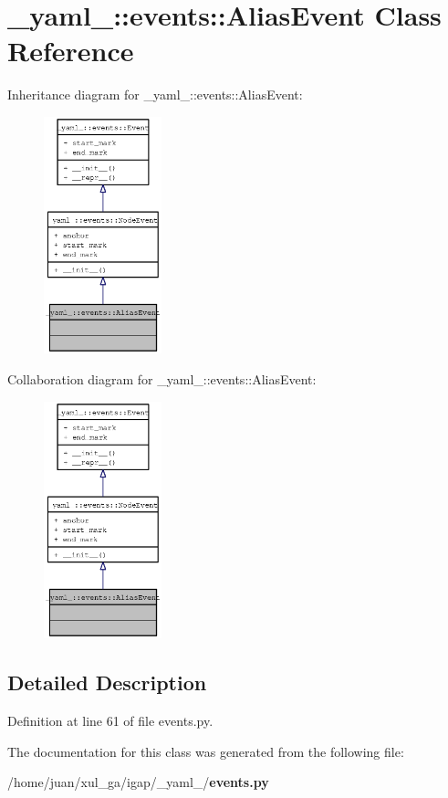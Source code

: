 \section{\_\-yaml\_\-::events::AliasEvent Class Reference}
\label{class__yaml___1_1events_1_1AliasEvent}
Inheritance diagram for \_\-yaml\_\-::events::AliasEvent:\nopagebreak
\begin{figure}[H]
\begin{center}
\leavevmode
\includegraphics[width=97pt]{class__yaml___1_1events_1_1AliasEvent__inherit__graph}
\end{center}
\end{figure}
Collaboration diagram for \_\-yaml\_\-::events::AliasEvent:\nopagebreak
\begin{figure}[H]
\begin{center}
\leavevmode
\includegraphics[width=97pt]{class__yaml___1_1events_1_1AliasEvent__coll__graph}
\end{center}
\end{figure}


\subsection{Detailed Description}


Definition at line 61 of file events.py.

The documentation for this class was generated from the following file:\begin{CompactItemize}
\item 
/home/juan/xul\_\-ga/igap/\_\-yaml\_\-/{\bf events.py}\end{CompactItemize}
